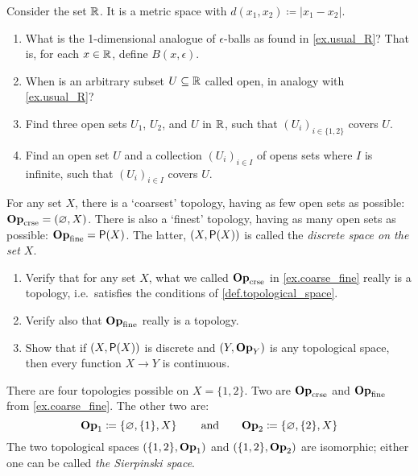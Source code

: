 \documentclass[7Sketches]{subfiles}
\begin{document}
\begin{exercise}%
\label{ex.usual_top_R}
Consider the set $\mathbb{R}$. It is a metric space with $d(x_1,x_2)\coloneqq|x_1-x_2|$.
\begin{enumerate}
	\item What is the 1-dimensional analogue of $\epsilon$-balls as found in \cref{ex.usual_R}? That is, for each $x\in\mathbb{R}$, define $B(x,\epsilon)$.
	\item When is an arbitrary subset $U\subseteq\mathbb{R}$ called open, in analogy with \cref{ex.usual_R}?
	\item Find three open sets $U_1$, $U_2$, and $U$ in $\mathbb{R}$, such that $(U_i)_{i\in\{1,2\}}$ covers $U$.
	\item Find an open set $U$ and a collection $(U_i)_{i\in I}$ of opens sets where $I$ is infinite, such that $(U_i)_{i\in I}$ covers $U$.
\qedhere
\end{enumerate}
\end{exercise}


\begin{example}%
\label{ex.coarse_fine}%
For any set $X$, there is a `coarsest' topology, having as few open sets as possible: $\mathbf{Op}_{\mathrm{crse}}=(\varnothing,X)$. There is also a `finest' topology, having as many open sets as possible: $\mathbf{Op}_{\mathrm{fine}}=\mathsf{P}(X)$. The latter, $(X,\mathsf{P}(X))$ is called the \emph{discrete space on the set $X$}.
\end{example}

\begin{exercise}%
\label{exc.course_fine}
\begin{enumerate}
	\item Verify that for any set $X$, what we called $\mathbf{Op}_{\mathrm{crse}}$ in \cref{ex.coarse_fine} really is a topology, i.e.\ satisfies the conditions of \cref{def.topological_space}.
	\item Verify also that $\mathbf{Op}_{\mathrm{fine}}$ really is a topology.
	\item Show that if $(X,\mathsf{P}(X))$ is discrete and $(Y,\mathbf{Op}_Y)$ is any topological space, then every function $X\to Y$ is continuous.
\qedhere
\end{enumerate}
\end{exercise}


\begin{example}%
\label{ex.Sierpinski}%
There are four topologies possible on $X=\{1,2\}$. Two are $\mathbf{Op}_{\mathrm{crse}}$ and $\mathbf{Op}_{\mathrm{fine}}$ from \cref{ex.coarse_fine}. The other two are:
\[
  \mathbf{Op}_1\coloneqq\left\{\varnothing,\{1\},X\right\}
  \qquad\text{and}\qquad
  \mathbf{Op}_2\coloneqq\left\{\varnothing,\{2\},X\right\}
\]
The two topological spaces $(\{1,2\},\mathbf{Op}_1)$ and $(\{1,2\},\mathbf{Op}_2)$ are isomorphic; either one can be called \emph{the Sierpinski space}.
\end{example}
\end{document}
